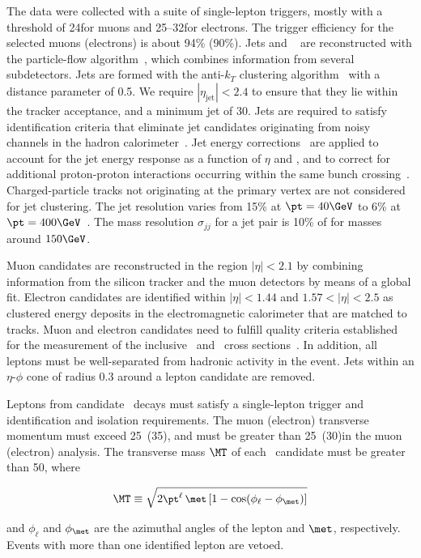 
The data were collected with a suite of single-lepton triggers, mostly
with a \pt threshold of 24\GeV for muons and 25--32\GeV for
electrons. The trigger efficiency for the selected muons (electrons)
is about 94\% (90\%).  Jets and
\met~\cite{Chatrchyan:2011tn,WZCMS:2010} are reconstructed with the
particle-flow algorithm~\cite{PFT-09-001}, which combines information
from several subdetectors.  Jets are formed with the anti-$k_T$
clustering algorithm~\cite{ref:antikt} with a distance parameter of
0.5.  We require $|\eta_{\textrm{jet}}| < 2.4$ to ensure that they lie
within the tracker acceptance, and a minimum jet \pt of 30\GeV.  Jets
are required to satisfy identification criteria that eliminate jet
candidates originating from noisy channels in the hadron
calorimeter~\cite{Chatrchyan:2009hy}.  Jet energy
corrections~\cite{Chatrchyan:2011ds} are applied to account for the
jet energy response as a function of $\eta$ and \pt, and to correct
for additional proton-proton interactions occurring within the same
bunch crossing~\cite{fastjet1,fastjet2}.  Charged-particle tracks not
originating at the primary vertex are not considered for jet
clustering. The jet \pt resolution varies from 15\% at $\pt = 40\GeV$
to 6\% at $\pt = 400\GeV$~\cite{Chatrchyan:2011ds}.  The mass
resolution $\sigma_{jj}$ for a jet pair is 10\% of \mjj for masses
around $150\GeV$.

Muon candidates are reconstructed in the region $|\eta| < 2.1$ by
combining information from the silicon tracker and the muon detectors
by means of a global fit.  Electron candidates are identified within
$|\eta|<1.44$ and $1.57<|\eta|<2.5$ as clustered energy deposits in
the electromagnetic calorimeter that are matched to tracks.  Muon and electron
candidates need to fulfill quality criteria established for the
measurement of the inclusive \PW\ and \PZ\ cross sections~\cite{WZCMS:2010}.
In addition, all leptons must be well-separated from hadronic activity
in the event.  Jets within an $\eta$-$\phi$ cone of radius 0.3 around
a lepton candidate are removed.

Leptons from candidate \Wln\ decays must satisfy a single-lepton
trigger and identification and isolation requirements.  The muon
(electron) transverse momentum must exceed 25~(35)\GeV, and \met must
be greater than 25~(30)\GeV in the muon (electron) analysis.  The
transverse mass $\MT$ of each \PW\ candidate must be greater than
50\GeV, where
\begin{linenomath}
\begin{align}
\MT \equiv {\small \sqrt{2\pt^\ell\,\met\,[1-\cos(\phi_\ell-\phi_{\met})]} }
\nonumber
\end{align}
\end{linenomath}
and $\phi_\ell$ and $\phi_{\met}$ are the azimuthal angles of the lepton
and $\met$, respectively. Events with more than one identified lepton
are vetoed.


